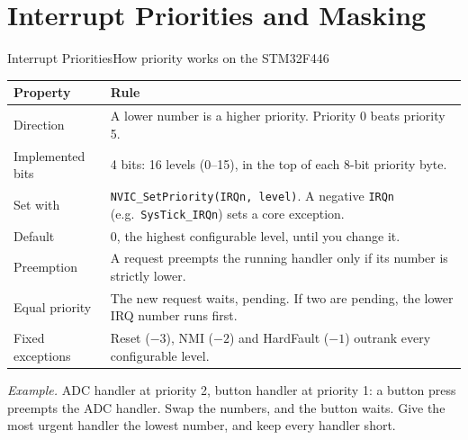\documentclass[9pt,aspectratio=169,xcolor=table]{beamer}
\begin{document}
\section{Interrupt Priorities and Masking}

\begin{frame}{Interrupt Priorities}{How priority works on the STM32F446}
    \begin{center}
    {\footnotesize
    \striped
    \begin{tabular}{@{}l R{.7\textwidth}@{}}
        \toprule
        \textbf{Property} & \textbf{Rule} \\
        \midrule
        Direction & A \alert{lower} number is a \alert{higher} priority. Priority 0 beats priority 5. \\
        Implemented bits & 4 bits: 16 levels (0--15), in the top of each 8-bit priority byte. \\
        Set with & \texttt{NVIC\_SetPriority(IRQn, level)}. A negative \texttt{IRQn} (e.g.\ \texttt{SysTick\_IRQn}) sets a core exception. \\
        Default & 0, the highest configurable level, until you change it. \\
        Preemption & A request preempts the running handler only if its number is strictly lower. \\
        Equal priority & The new request waits, pending. If two are pending, the lower IRQ number runs first. \\
        Fixed exceptions & Reset ($-3$), NMI ($-2$) and HardFault ($-1$) outrank every configurable level. \\
        \bottomrule
    \end{tabular}}
    \end{center}

    \vspace{2mm}
    {\small \emph{Example.} ADC handler at priority 2, button handler at priority 1: a button press preempts the ADC handler. Swap the numbers, and the button waits. Give the most urgent handler the lowest number, and keep every handler short.}
\end{frame}
\end{document}
